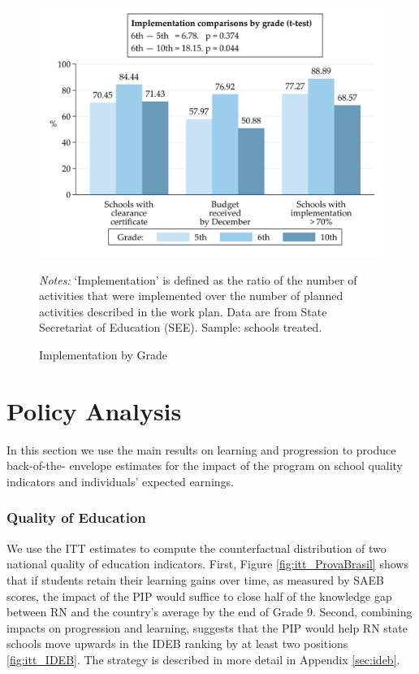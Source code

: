\documentclass[11pt,a4paper]{article}
\begin{document}
\begin{figure}[htbp]
    \caption{Implementation by Grade}
    \label{fig:implementation_byGrade}
    \centering
    \includegraphics[width=13.4cm]{DataWork/Output/Figures/fig2-implementation_byGrade.png}
    \begin{minipage}{0.825\textwidth}
        \small{\textit{Notes:} `Implementation' is defined as the ratio of the number of activities that were implemented over the number of planned activities described in the work plan. Data are from State Secretariat of Education (SEE). Sample: schools treated.}
    \end{minipage}
\end{figure}
\FloatBarrier


\section{Policy Analysis} \label{sec:policy}

In this section we use the main results on learning and progression to produce back-of-the- envelope estimates for the impact of the program on school quality indicators and individuals' expected earnings.

\subsubsection*{Quality of Education} 

We use the ITT estimates to compute the counterfactual distribution of two national quality of education indicators. First, Figure \ref{fig:itt_ProvaBrasil} shows that if students retain their learning gains over time, as measured by SAEB scores, the impact of the PIP would suffice to close half of the knowledge gap between RN and the country's average by the end of Grade 9. Second, combining impacts on progression and learning, suggests that the PIP would help RN state schools move upwards in the IDEB ranking by at least two positions \ref{fig:itt_IDEB}. The strategy is described in more detail in Appendix \ref{sec:ideb}.  
\end{document}
